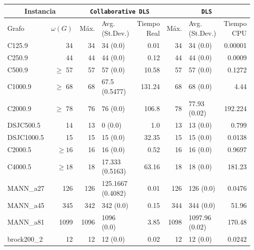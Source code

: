 \documentclass[conference]{IEEEtran}
\begin{document}
\begin{center}
\begin{table}[ht]
{\small
\hfill{}
\begin{tabular}{lr|rlr|rlr}
\hline
\multicolumn{2}{c}{Instancia} &
\multicolumn{3}{|c|}{\texttt{Collaborative DLS}} &
\multicolumn{3}{c}{\texttt{DLS}}\\
\hline
 Grafo             &  $\omega(G)$  &  Máx.  &  Avg.(St.Dev.)      &  Tiempo Real  &  Máx.  &  Avg.(St.Dev.)   &  Tiempo CPU  \\
\hline
 C125.9            &           34  &    34  &  34 (0.0)           &         0.01  &    34  &  34 (0.0)        &     0.00001  \\
 C250.9            &           44  &    44  &  44 (0.0)           &         0.12  &    44  &  44 (0.0)        &      0.0009  \\
 C500.9            &    $\geq$ 57  &    57  &  57 (0.0)           &        10.58  &    57  &  57 (0.0)        &      0.1272  \\
 C1000.9           &    $\geq$ 68  &    68  &  67.5 (0.5477)      &       131.24  &    68  &  68 (0.0)        &        4.44  \\
 C2000.9           &    $\geq$ 78  &    76  &  76 (0.0)           &        106.8  &    78  &  77.93 (0.02)    &     192.224  \\
 DSJC500.5         &           14  &    13  &  0 (0.0)            &          1.0  &    13  &  13 (0.0)        &       0.799  \\
 DSJC1000.5        &           15  &    15  &  15 (0.0)           &        32.35  &    15  &  15 (0.0)        &      0.0138  \\
 C2000.5           &    $\geq 16$  &    16  &  16 (0.0)           &         0.52  &    16  &  16 (0.0)        &      0.9697  \\
 C4000.5           &    $\geq 18$  &    18  &  17.333 (0.5163)    &        63.16  &    18  &  18 (0.0)        &      181.23  \\
 MANN\_a27         &          126  &   126  &  125.1667 (0.4082)  &         0.01  &   126  &  126 (0.0)       &      0.0476  \\
 MANN\_a45         &          345  &   342  &  342 (0.0)          &         0.15  &   344  &  344 (0.0)       &       51.96  \\
 MANN\_a81         &         1099  &  1096  &  1096 (0.0)         &         3.85  &  1098  &  1097.96 (0.02)  &      170.48  \\
 brock200\_2       &           12  &    12  &  12 (0.0)           &         0.02  &    12  &  12 (0.0)        &      0.0242  \\

\end{tabular}}
\end{table}
\end{center}
\end{document}

